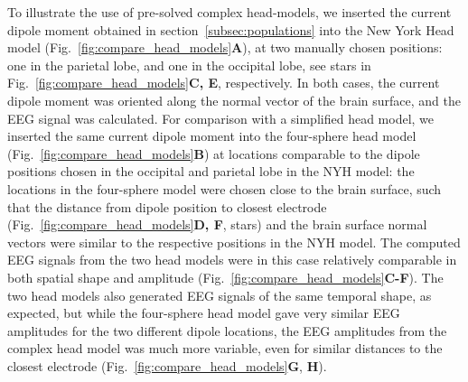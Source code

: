 \documentclass[preprint,10pt,authoryear]{elsarticle}
\newcommand{\hlb}[2][NavyBlue]{ {\sethlcolor{#1} \hl{#2}} }
\newcommand{\hlg}[2][Emerald]{ {\sethlcolor{#1} \hl{#2}} }
\newcommand{\hlp}[2][Purple]{ {\sethlcolor{#1} \hl{#2}} }
\newcommand{\snnote}[1]{\color{white}{\hlb{SN: #1 }}\color{black}}
\newcommand{\sntxt}[1]{{\color{NavyBlue}#1}}
\newcommand{\tvnnote}[1]{\color{white}{\hlg{TVN: #1 }}\color{black}}
\newcommand{\gen}[1]{\color{white}{\hlp{GTE: #1 }}\color{black}}
\begin{document}

To illustrate the use of pre-solved complex head-models, we inserted the current dipole moment obtained in section~\ref{subsec:populations} into the New York Head model (Fig.~\ref{fig:compare_head_models}\textbf{A}), at two manually chosen positions: one in the parietal lobe, and one in the occipital lobe, see stars in Fig.~\ref{fig:compare_head_models}\textbf{C, E}, respectively.
	In both cases, the current dipole moment was oriented along the normal vector of the brain surface, and the EEG signal was calculated.
\sntxt{For comparison with a simplified head model, we inserted the same current dipole moment into the four-sphere head model  (Fig.~\ref{fig:compare_head_models}\textbf{B}) at locations comparable to the dipole positions chosen in the occipital and parietal lobe in the NYH model: the locations in the four-sphere model were chosen close to the brain surface, such that the distance from dipole position to closest electrode (Fig.~\ref{fig:compare_head_models}\textbf{D, F}, stars) and the brain surface normal vectors were similar to the respective positions in the NYH model.}
The computed EEG signals from the two head models were in this case relatively comparable in both spatial shape and amplitude (Fig.~\ref{fig:compare_head_models}\textbf{C-F}). The two head models also generated EEG signals of the same temporal shape, as expected, but while the four-sphere head model gave very similar EEG amplitudes for the two different dipole locations, the EEG amplitudes from the complex head model was much more variable, even for similar distances to the closest electrode (Fig.~\ref{fig:compare_head_models}{\bf G}, {\bf H}).
\end{document}
